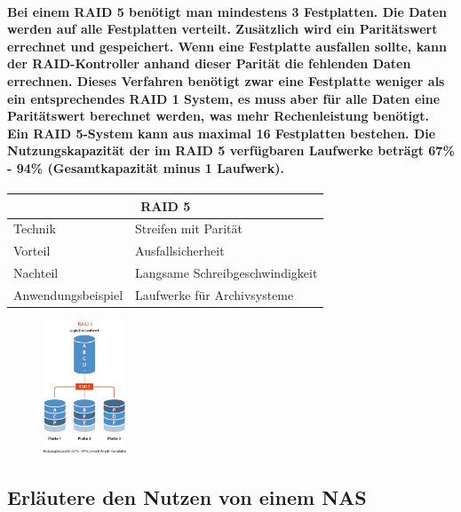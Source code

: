 \documentclass[a4paper]{article}
\begin{document}
    \paragraph{\color{codegreen}Bei einem RAID 5 benötigt man mindestens 3 Festplatten. Die Daten werden auf alle Festplatten verteilt. Zusätzlich wird ein Paritätswert errechnet und gespeichert. Wenn eine Festplatte ausfallen sollte, kann der RAID-Kontroller anhand dieser Parität die fehlenden Daten errechnen. Dieses Verfahren benötigt zwar eine Festplatte weniger als ein entsprechendes RAID 1 System, es muss aber für alle Daten eine Paritätswert berechnet werden, was mehr Rechenleistung benötigt. Ein RAID 5-System kann aus maximal 16 Festplatten bestehen. Die Nutzungskapazität der im RAID 5 verfügbaren Laufwerke beträgt 67\% - 94\% (Gesamtkapazität minus 1 Laufwerk).\\}
    \begin{vwcol}[widths={0.6,0.4}]
        \begin{tabular}{ll}
            \multicolumn{2}{c}{RAID 5}                                                \\ \hline
            \multicolumn{1}{l|}{Technik}            & Streifen mit Parität            \\
            \multicolumn{1}{l|}{Vorteil}            & Ausfallsicherheit               \\
            \multicolumn{1}{l|}{Nachteil}           & Langsame Schreibgeschwindigkeit \\
            \multicolumn{1}{l|}{Anwendungsbeispiel} & Laufwerke für Archivsysteme
        \end{tabular}
        \begin{figure}[H]
            \includegraphics[height=4cm]{media/raid5}
            \label{fig:raid5}
        \end{figure}
    \end{vwcol}
    \subsection{\color{red} Erläutere den Nutzen von einem NAS}\label{subsec:erläutere-den-nutzen-von-einem-nas}
\end{document}
